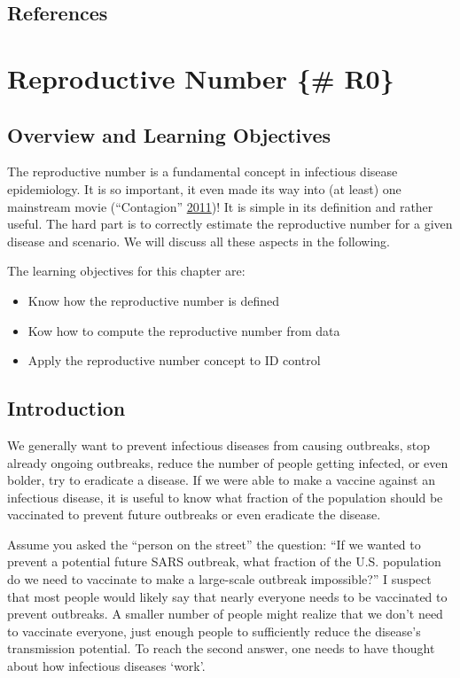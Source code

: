 \documentclass[]{book}
\providecommand{\tightlist}{%
  \setlength{\itemsep}{0pt}\setlength{\parskip}{0pt}}
\theoremstyle{definition}
\theoremstyle{definition}
\theoremstyle{definition}
\theoremstyle{remark}
\begin{document}
\section{References}\label{references-3}

\chapter{Reproductive Number \{\# R0\}}\label{reproductive-number-r0}

\section{Overview and Learning
Objectives}\label{overview-and-learning-objectives-3}

The reproductive number is a fundamental concept in infectious disease
epidemiology. It is so important, it even made its way into (at least)
one mainstream movie (``Contagion''
\protect\hyperlink{ref-contagionmovie}{2011})! It is simple in its
definition and rather useful. The hard part is to correctly estimate the
reproductive number for a given disease and scenario. We will discuss
all these aspects in the following.

The learning objectives for this chapter are:

\begin{itemize}
\tightlist
\item
  Know how the reproductive number is defined
\item
  Kow how to compute the reproductive number from data
\item
  Apply the reproductive number concept to ID control
\end{itemize}

\section{Introduction}\label{introduction-3}

We generally want to prevent infectious diseases from causing outbreaks,
stop already ongoing outbreaks, reduce the number of people getting
infected, or even bolder, try to eradicate a disease. If we were able to
make a vaccine against an infectious disease, it is useful to know what
fraction of the population should be vaccinated to prevent future
outbreaks or even eradicate the disease.

Assume you asked the ``person on the street'' the question: ``If we
wanted to prevent a potential future SARS outbreak, what fraction of the
U.S. population do we need to vaccinate to make a large-scale outbreak
impossible?'' I suspect that most people would likely say that nearly
everyone needs to be vaccinated to prevent outbreaks. A smaller number
of people might realize that we don't need to vaccinate everyone, just
enough people to sufficiently reduce the disease's transmission
potential. To reach the second answer, one needs to have thought about
how infectious diseases `work'.
\end{document}
